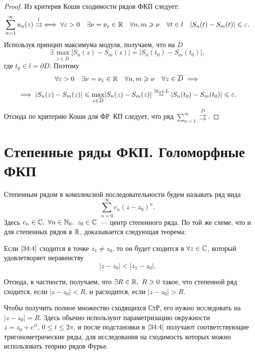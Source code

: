 \documentclass[../../main.tex]{subfiles}
\begin{document}
\begin{proof}
	Из критерия Коши сходимости рядов ФКП следует:
	\[ \sum\limits_{n = 1}^{\infty} u_n(z) \overset{l}\rightrightarrows \iff 
	\forall \varepsilon > 0\quad \exists \nu = \nu_\varepsilon \in \mathbb{R} \quad \forall n, m 
	\geqslant \nu \quad \forall t \in l \quad |S_n(t) - S_m(t)| \leqslant \varepsilon. \]
	Используя принцип максимума модуля, получаем, что на $ \overline{D} $ 
	\[\exists\, \underset{z \in \overline{D}}{\max}|S_n(z) - S_m(z)| = |S_n(t_0) 
	- S_m(t_0)| ,\] 
	где $ t_0 \in l = \partial D $.
	Поэтому \[ \forall \varepsilon > 0\quad \exists \nu = \nu_\varepsilon \in \mathbb{R} \quad \forall 
	n, m \geqslant \nu \quad \forall z \in \overline{D} \implies\]
	\[\implies |S_n(z) - S_m(z)| 
	\leqslant \underset{z \in \overline{D}}{\max}|S_n(z) - S_m(z)| \overset{\exists 
	t_0 \in L}= 
	|S_n(t_0) - S_m(t_0)| \leqslant \varepsilon.\]
	Отсюда по критерию Коши для ФР~КП следует, что ряд $ \sum\limits_{n = 
	1}^{\infty} \overset{\overline{D}}\rightrightarrows $.
\end{proof}

\section{Степенные ряды ФКП. Голоморфные ФКП}

Степенным рядом в комплексной последовательности будем называть ряд вида
\begin{equation}\label{34:4}
	\sum\limits_{n = 0}^{\infty} c_n (z - z_0)^n.
\end{equation}
Здесь $ c_n \in \mathbb{C},\ \forall n \in \mathbb{N}_0.$ $z_0 \in \mathbb{C} $~--- центр 
степенного ряда. По той же схеме, что и для степенных рядов в $ \mathbb{R} $, 
доказывается следующая теорема:
\begin{thm}
	Если $ \eqref{34:4} $ сходится в точке $ z_1 \neq z_0 $, то он будет сходится 
	в
	$ \forall z \in \mathbb{C} $, который удовлетворяет неравенству
	\[ |z - z_0| < |z_1 - z_0|. \]
\end{thm}

Отсюда, в частности, получаем, что $ \exists R \in \mathbb{R},\ R \geqslant 0$ такое, 
что степенной ряд сходится, если $ |z - z_0| < R $, и расходится, если
$ |z - z_0| > R $.

Чтобы получить полное множество сходящихся СтР, его нужно исследовать на
${|z - z_0| = R}$. Здесь обычно используют параметризацию окружности
$ z = z_0 + e^{it},\, 0 \leq t \leq 2\pi $, и после подстановки в $ 
\eqref{34:4} $ получают 
соответствующие тригонометрические ряды, для исследования на сходимость 
которых можно использовать теорию рядов Фурье.
\end{document}
